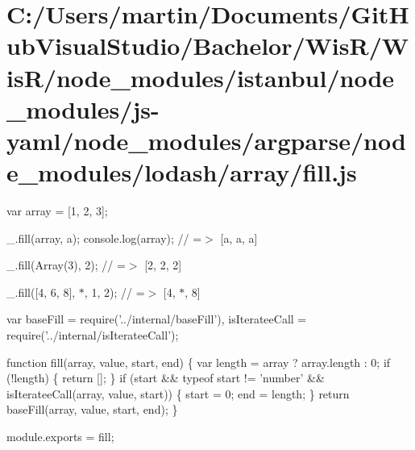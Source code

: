 \hypertarget{_c_1_2_users_2martin_2_documents_2_git_hub_visual_studio_2_bachelor_2_wis_r_2_wis_r_2node_module2fa708454c75d293480be5f3870ef3d5}{}\section{C\+:/\+Users/martin/\+Documents/\+Git\+Hub\+Visual\+Studio/\+Bachelor/\+Wis\+R/\+Wis\+R/node\+\_\+modules/istanbul/node\+\_\+modules/js-\/yaml/node\+\_\+modules/argparse/node\+\_\+modules/lodash/array/fill.\+js}
var array = \mbox{[}1, 2, 3\mbox{]};

\+\_\+.\+fill(array, \textquotesingle{}a\textquotesingle{}); console.\+log(array); // =$>$ \mbox{[}\textquotesingle{}a\textquotesingle{}, \textquotesingle{}a\textquotesingle{}, \textquotesingle{}a\textquotesingle{}\mbox{]}

\+\_\+.\+fill(\+Array(3), 2); // =$>$ \mbox{[}2, 2, 2\mbox{]}

\+\_\+.\+fill(\mbox{[}4, 6, 8\mbox{]}, \textquotesingle{}$\ast$\textquotesingle{}, 1, 2); // =$>$ \mbox{[}4, \textquotesingle{}$\ast$\textquotesingle{}, 8\mbox{]}


\begin{DoxyCodeInclude}
var baseFill = require(\textcolor{stringliteral}{'../internal/baseFill'}),
    isIterateeCall = require(\textcolor{stringliteral}{'../internal/isIterateeCall'});

\textcolor{keyword}{function} fill(array, value, start, end) \{
  var length = array ? array.length : 0;
  \textcolor{keywordflow}{if} (!length) \{
    \textcolor{keywordflow}{return} [];
  \}
  \textcolor{keywordflow}{if} (start && typeof start != \textcolor{stringliteral}{'number'} && isIterateeCall(array, value, start)) \{
    start = 0;
    end = length;
  \}
  \textcolor{keywordflow}{return} baseFill(array, value, start, end);
\}

module.exports = fill;
\end{DoxyCodeInclude}
 